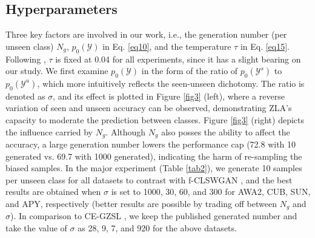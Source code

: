 \documentclass{article}
\begin{document}
\subsection{Hyperparameters}
\label{hype}
Three key factors are involved in our work, i.e., the generation number (per unseen class) $N_g$, $p_0(\mathcal{Y})$ in Eq. \ref{eq10}, and the temperature $\tau$ in Eq. \ref{eq15}. Following \cite{skorokhodov2020class}, $\tau$ is fixed at 0.04 for all experiments, since it has a slight bearing on our study. We first examine $p_0(\mathcal{Y})$ in the form of the ratio of $p_0(\mathcal{Y}^s)$ to $p_0(\mathcal{Y}^u)$, which more intuitively reflects the seen-unseen dichotomy. The ratio is denoted as $\sigma$, and its effect is plotted in Figure \ref{fig3} (left), where a reverse variation of seen and unseen accuracy can be observed, demonstrating ZLA's capacity to moderate the prediction between classes. Figure \ref{fig3} (right) depicts the influence carried by $N_g$. Although $N_g$ also posses the ability to affect the accuracy, a large generation number lowers the performance cap (72.8 with 10 generated vs. 69.7 with 1000 generated), indicating the harm of re-sampling the biased samples. In the major experiment (Table \ref{tab2}), we generate 10 samples per unseen class for all datasets to contrast with f-CLSWGAN \cite{xian2018feature}, and the best results are obtained when $\sigma$ is set to 1000, 30, 60, and 300 for AWA2, CUB, SUN, and APY, respectively (better results are possible by trading off between $N_g$ and $\sigma$). In comparison to CE-GZSL \cite{han2021contrastive}, we keep the published generated number and take the value of $\sigma$ as 28, 9, 7, and 920 for the above datasets.
\end{document}
